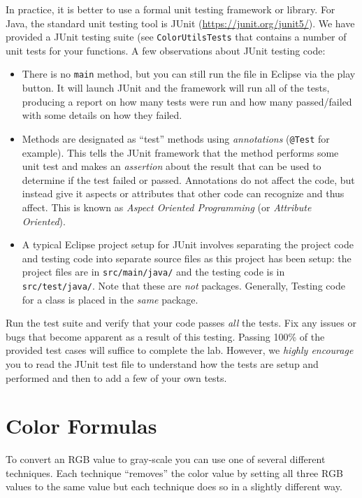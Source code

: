 \documentclass[12pt]{scrartcl}
\begin{document}
In practice, it is better to use a formal unit testing framework
or library.  For Java, the standard unit testing tool is JUnit 
(\url{https://junit.org/junit5/}).  We have provided a JUnit
testing suite (see \texttt{ColorUtilsTests} that
contains a number of unit tests for your functions.  A few
observations about JUnit testing code:
\begin{itemize}
  \item There is no \texttt{main} method, but you can
  still run the file in Eclipse via the play button.  It will 
  launch JUnit and the framework will run all of the tests, 
  producing a report on how many tests were run and how many
  passed/failed with some details on how they failed.
  \item Methods are designated as ``test'' methods using 
  \emph{annotations} (\texttt{@Test} for example).
  This tells the JUnit framework that the method performs
  some unit test and makes an \emph{assertion} about the 
  result that can be used to determine if the test failed or
  passed.  Annotations do not affect the code, but instead
  give it aspects or attributes that other code can recognize
  and thus affect.  This is known as \emph{Aspect Oriented Programming}
  (or \emph{Attribute Oriented}).
  \item A typical Eclipse project setup for JUnit involves
  separating the project code and testing code into separate
  source files as this project has been setup: the project 
  files are in \texttt{src/main/java/} and the
  testing code is in \texttt{src/test/java/}.  Note
  that these are \emph{not} packages.  Generally, Testing
  code for a class is placed in the \emph{same} package.
\end{itemize}

Run the test suite and verify that your code passes \emph{all} 
the tests.  Fix any issues or bugs that become apparent as a 
result of this testing.  Passing 100\% of the provided test cases
will suffice to complete the lab.  However, we \emph{highly encourage}
you to read the JUnit test file to understand how the tests are setup
and performed and then to add a few of your own tests.  

\section*{Color Formulas}

To convert an RGB value to gray-scale you can use one of several
different techniques.  Each technique ``removes'' the color value by
setting all three RGB values to the same value but each technique 
does so in a slightly different way.
\end{document}
